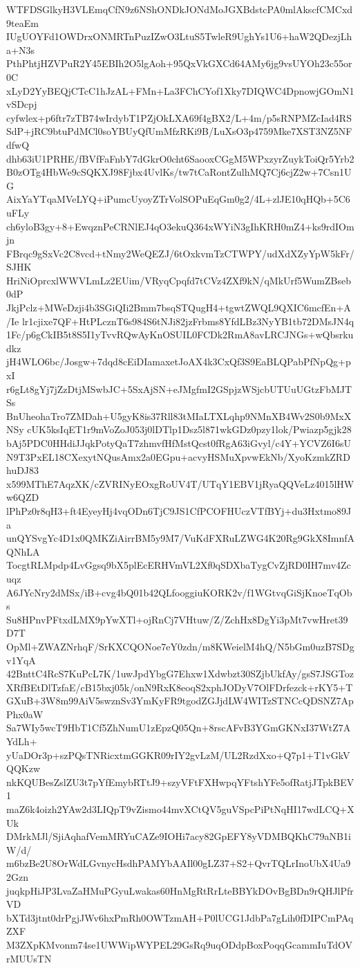 WTFDSGlkyH3VLEmqCfN9z6NShONDkJONdMoJGXBdstcPA0mlAkscfCMCxd9teaEm
IUgUOYFd1OWDrxONMRTnPuzIZwO3LtuS5TwleR9UghYs1U6+haW2QDezjLha+N3s
PthPhtjHZVPuR2Y45EBIh2O5lgAoh+95QxVkGXCd64AMy6jg9vsUYOh23c55or0C
xLyD2YyBEQjCTcC1hJzAL+FMn+La3FChCYof1Xky7DIQWC4DpnowjGOmN1vSDcpj
cyfwlex+p6ftr7zTB74wIrdybT1PZjOkLXA69f4gBX2/L+4m/p5sRNPMZcIad4RS
SdP+jRC9btuPdMCl0soYBUyQfUmMfzRKi9B/LuXsO3p4759Mke7XST3NZ5NFdfwQ
dhb63iU1PRHE/fBVfFaFnbY7dGkrO0cht6SaooxCGgM5WPxzyrZuykToiQr5Yrb2
B0zOTg4HbWe9cSQKXJ98Fjbx4UvlKs/tw7tCaRontZulhMQ7Cj6cjZ2w+7Csn1UG
AixYaYTqaMVeLYQ+iPumcUyoyZTrVolSOPuEqGm0g2/4L+zlJE10qHQb+5C6uFLy
ch6yloB3gy+8+EwqznPeCRNlEJ4qO3ekuQ364xWYiN3gIhKRH0mZ4+ks9rdIOmjn
FBrqc9gSxVc2C8vcd+tNmy2WeQEZJ/6tOxkvmTzCTWPY/udXdXZyYpW5kFr/SJHK
HriNiOprcxlWWVLmLz2EUim/VRyqCpqfd7tCVz4ZXf9kN/qMkUrf5WumZBseb0dP
JkjPclz+MWeDzji4b3SGiQIi2Bmm7bsqSTQugH4+tgwtZWQL9QXIC6mcfEn+A/Ie
lr1cjixe7QF+HtPLcznT6s984S6tNJi82jzFrbms8YfdLBz3NyYB1tb72DMsJN4q
1Fc/p6gCkIB5t8S5I1yTvvRQwAyKnOSUIL0FCDk2RmA8avLRCJNGs+wQbsrkudkz
jH4WLO6bc/Josgw+7dqd8cEiDIamaxetJoAX4k3CxQf3S9EaBLQPabPfNpQg+pxI
r6gLt8gYj7jZzDtjMSwbJC+5SxAjSN+eJMgfmI2GSpjzWSjcbUTUuUGtzFbMJTSs
BnUheohaTro7ZMDah+U5gyK8is37Rll83tMIaLTXLqhp9NMnXB4Wv2S0b9MxXNSy
cUK5ksIqET1r9mVoZoJ053j0lDTlp1Dsz5l871wkGDz0pzy1lok/Pwiazp5gjk28
bAj5PDC0HHdiJJqkPotyQaT7zhmvfHfMstQcst0fRgA63iGvyl/c4Y+YCVZ6I6sU
N9T3PxEL18CXexytNQusAmx2a0EGpu+acvyHSMuXpvwEkNb/XyoKzmkZRDhuDJ83
x599MThE7AqzXK/cZVRINyEOxgRoUV4T/UTqY1EBV1jRyaQQVeLz4015lHWw6QZD
lPhPz0r8qH3+ft4EyeyHj4vqODn6TjC9JS1CfPCOFHUczVTfBYj+du3Hxtmo89Ja
unQYSvgYc4D1x0QMKZiAirrBM5y9M7/VuKdFXRuLZWG4K20Rg9GkX8ImnfAQNhLA
TocgtRLMpdp4LvGgsq9bX5plEcERHVmVL2Xf0qSDXbaTygCvZjRD0IH7mv4Zcuqz
A6JYcNry2dMSx/iB+cvg4bQ01b42QLfooggiuKORK2v/f1WGtvqGiSjKnoeTqObs
Su8HPnvPFtxdLMX9pYwXTl+ojRnCj7VHtuw/Z/ZchHx8DgYi3pMt7vwHret39D7T
OpMl+ZWAZNrhqF/SrKXCQONoe7eY0zdn/m8KWeielM4hQ/N5bGm0uzB7SDgv1YqA
42BnttC4RcS7KuPcL7K/1uwJpdYbgG7Ehxw1Xdwbzt30SZjbUkfAy/gsS7JSGToz
XRfBEtDlTzfaE/cB15bxj05k/onN9RxK8eoqS2xphJODyV7OlFDrfezck+rKY5+T
GXuB+3W8m99AiV5swznSv3YmKyFR9tgodZGJjdLW4WITzSTNCcQDSNZ7ApPhx0aW
Sa7WIy5wcT9HbT1Cf5ZhNumU1zEpzQ05Qn+8rscAFvB3YGmGKNxI37WtZ7AYdLh+
yUaDOr3p+szPQsTNRicxtmGGKR09rIY2gvLzM/UL2RzdXxo+Q7p1+T1vGkVQQKzw
nkKQUBesZslZU3t7pYfEmybRTtJ9+szyVFtFXHwpqYFtshYFe5ofRatjJTpkBEV1
maZ6k4oizh2YAw2d3LIQpT9vZismo44mvXCtQV5guVSpcPiPtNqHI17wdLCQ+XUk
DMrkMJl/SjiAqhafVemMRYuCAZe9IOHi7acy82GpEFY8yVDMBQKhC79aNB1iW/d/
m6bzBe2U8OrWdLGvnycHsdhPAMYbAAIl00gLZ37+S2+QvrTQLrInoUbX4Ua92Gzn
juqkpHiJP3LvaZaHMuPGyuLwakas60HnMgRtRrLteBBYkDOvBgBDn9rQHJlPfrVD
bXTd3jtnt0drPgjJWv6hxPmRh0OWTzmAH+P0lUCG1JdbPa7gLih0fDIPCmPAqZXF
M3ZXpKMvonm74se1UWWipWYPEL29GsRq9uqODdpBoxPoqqGcammIuTdOVrMUUsTN
